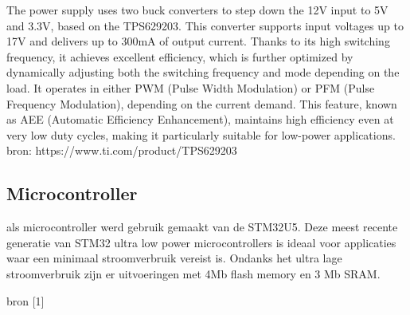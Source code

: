 The power supply uses two buck converters to step down the 12V input to 5V and 3.3V, based on the TPS629203.
 This converter supports input voltages up to 17V and delivers up to 300mA of output current.
 Thanks to its high switching frequency, it achieves excellent efficiency, which is further optimized by dynamically adjusting both the switching frequency and mode depending on the load. It operates in either PWM (Pulse Width Modulation) or PFM (Pulse Frequency Modulation), depending on the current demand. This feature, known as AEE (Automatic Efficiency Enhancement), maintains high efficiency even at very low duty cycles, making it particularly suitable for low-power applications.\\


bron:	https://www.ti.com/product/TPS629203

\subsection{Microcontroller}

als microcontroller werd gebruik gemaakt van de STM32U5.
 Deze meest recente generatie van STM32 ultra low power microcontrollers
 is ideaal voor applicaties waar een minimaal stroomverbruik vereist is.
Ondanks het ultra lage stroomverbruik zijn er uitvoeringen met 4Mb flash memory en 3 Mb SRAM.



bron [1]




